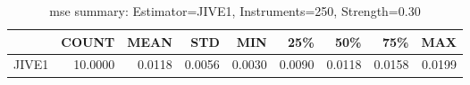 \begin{table}[ht]
\centering
\caption{mse summary: Estimator=JIVE1, Instruments=250, Strength=0.30}
\begin{tabular}{lrrrrrrrr}
\toprule
 & COUNT & MEAN & STD & MIN & 25\% & 50\% & 75\% & MAX \\
\midrule
JIVE1 & 10.0000 & 0.0118 & 0.0056 & 0.0030 & 0.0090 & 0.0118 & 0.0158 & 0.0199 \\
\bottomrule
\end{tabular}
\end{table}
